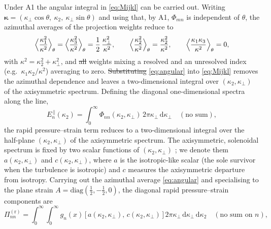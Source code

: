 \documentclass[lineno]{JFM-FLM_Au}
\providecommand{\DIFadd}[1]{{\protect\color{blue}\uwave{#1}}} %
\providecommand{\DIFdel}[1]{{\protect\color{red}\sout{#1}}} %
\providecommand{\DIFaddbegin}{} %
\providecommand{\DIFaddend}{} %
\providecommand{\DIFdelbegin}{} %
\providecommand{\DIFdelend}{} %
\begin{document}
Under A1 the angular integral in \eqref{eq:Mijkl} can be carried out. Writing
$\boldsymbol{\kappa}=(\kappa_\perp\cos\theta,\ \kappa_2,\
\kappa_\perp\sin\theta)$ and using that, by A1, $\Phi_{mn}$ is independent of
$\theta$, the azimuthal averages of the projection weights reduce to
\begin{equation}
  \Bigl\langle \frac{\kappa_1^2}{\kappa^2}\Bigr\rangle_\theta
  = \Bigl\langle \frac{\kappa_3^2}{\kappa^2}\Bigr\rangle_\theta
  = \frac{1}{2}\,\frac{\kappa_\perp^2}{\kappa^2},
  \qquad
  \Bigl\langle \frac{\kappa_2^2}{\kappa^2}\Bigr\rangle_\theta
  = \frac{\kappa_2^2}{\kappa^2},
  \qquad
  \Bigl\langle \frac{\kappa_1\kappa_3}{\kappa^2}\Bigr\rangle_\theta = 0,
  \label{eq:angular}
\end{equation}
with $\kappa^2=\kappa_2^2+\kappa_\perp^2$, and \DIFdelbegin \DIFdel{all }\DIFdelend \DIFaddbegin \DIFadd{the }\DIFaddend weights mixing a resolved
and an unresolved index (e.g.\ $\kappa_1\kappa_2/\kappa^2$) averaging to zero.
\DIFdelbegin \DIFdel{Substituting }\DIFdelend \DIFaddbegin \DIFadd{Substitution of }\DIFaddend \eqref{eq:angular} into \eqref{eq:Mijkl} removes the azimuthal
dependence and leaves a two-dimensional integral over $(\kappa_2,\kappa_\perp)$
of the axisymmetric spectrum. Defining the diagonal one-dimensional spectra
along the line,
\begin{equation}
  E_n^{\,\|}(\kappa_2)
   = \int_0^\infty \Phi_{nn}(\kappa_2,\kappa_\perp)\,
     2\pi\kappa_\perp\,\mathrm{d}\kappa_\perp
   \quad(\text{no sum}),
   \label{eq:Epar}
\end{equation}
the rapid pressure--strain term reduces to a two-dimensional integral over the
half-plane $(\kappa_2,\kappa_\perp)$ of the axisymmetric spectrum. The
axisymmetric, solenoidal spectrum is fixed by two scalar functions of
$(\kappa_2,\kappa_\perp)$ \citep{Batchelor1946,ChandrasekharAxisym1950}; we
denote them $a(\kappa_2,\kappa_\perp)$ and $c(\kappa_2,\kappa_\perp)$, where
$a$ is the isotropic-like scalar (the sole survivor when the turbulence is
isotropic) and $c$ measures the axisymmetric departure from isotropy. Carrying
out the azimuthal average \eqref{eq:angular} and specialising to the plane
strain $A=\mathrm{diag}(\tfrac12,-\tfrac12,0)$, the diagonal rapid
pressure--strain components are
\begin{equation}
  \Pi^{(\mathrm r)}_{nn}
  = \int_{0}^{\infty}\!\!\int_{0}^{\infty}
      g_{n}(x)\,\bigl[\,a(\kappa_2,\kappa_\perp),\,c(\kappa_2,\kappa_\perp)\,\bigr]\,
      2\pi\kappa_\perp\,\mathrm{d}\kappa_\perp\,\mathrm{d}\kappa_2
   \quad(\text{no sum on }n),
  \label{eq:Piclosed}
\end{equation}
\end{document}
